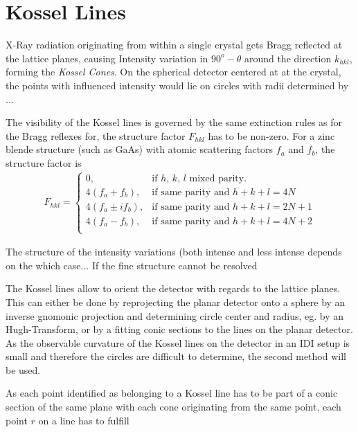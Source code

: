 

\label{chap:theory}








\section{Kossel Lines}
X-Ray radiation originating from within a single crystal gets Bragg reflected at the lattice planes, causing Intensity variation in $90^o-\theta$ around the direction $k_{hkl}$, forming the \textit{Kossel Cones}. On the spherical detector centered at at the crystal, the points with influenced intensity would lie on circles with radii determined by ...

The visibility of the Kossel lines is governed by the same extinction rules as for the Bragg reflexes for, the structure factor $F_{hkl}$ has to be non-zero. For a zinc blende structure (such as GaAs) with atomic scattering factors $f_a$ and $f_b$, the structure factor is
\begin{align}
F_{hkl} = \begin{cases}
0, & \text{if $h$, $k$, $l$ mixed parity}.\\
4(f_a+f_b), & \text{if same parity and $h+k+l = 4 N$} \\
4(f_a\pm i f_b), & \text{if same parity and $h+k+l = 2 N+1$} \\
4(f_a-f_b), & \text{if same parity and $h+k+l = 4 N+2$} \\
\end{cases}
\end{align}

The structure of the intensity variations (both intense and less intense depends on the which case...
If the fine structure cannot be resolved

The Kossel lines allow to orient the detector with regards to the lattice planes. This can either be done by reprojecting the planar detector onto a sphere by an inverse gnomonic projection and determining circle center and radius, eg. by an Hugh-Transform, or by a fitting conic sections to the lines on the planar detector. As the observable curvature of the Kossel lines on the detector in an IDI setup is small and therefore the circles are difficult to determine, the second method will be used. 

As each point identified as belonging to a Kossel line has to be part of a conic section of the same plane with each cone originating from the same point, each point $r$ on a line has to fulfill



